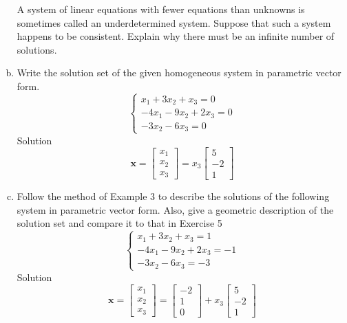 \begin{enumerate}[(a)]
    A system of linear equations with fewer equations than unknowns is sometimes called an underdetermined system. Suppose that such a system happens to be consistent. Explain why there must be an infinite number of solutions.
    \item
    Write the solution set of the given homogeneous system in parametric vector form.
    \begin{equation*}
        \begin{cases}
            x_{1}+3 x_{2}+x_{3}=0\\
            -4 x_{1}-9 x_{2}+2 x_{3}=0 \\
            -3 x_{2}-6 x_{3}=0
        \end{cases}
    \end{equation*}
    Solution
    $$\mathbf{x}=\left[\begin{array}{l}x_{1} \\ x_{2} \\ x_{3}\end{array}\right]=x_{3}\left[\begin{array}{r}5 \\ -2 \\ 1\end{array}\right]$$
    \item
    Follow the method of Example 3 to describe the solutions of the following system in parametric vector form. Also, give a geometric description of the solution set and compare it to that in Exercise 5
    \begin{equation*}
        \begin{cases}
            x_{1}+3 x_{2}+x_{3}=1 \\
            -4 x_{1}-9 x_{2}+2 x_{3}=-1 \\
            -3 x_{2}-6 x_{3} =-3
        \end{cases}
    \end{equation*}
    Solution
    $$
    \mathbf{x}=\left[\begin{array}{l}
    x_{1} \\
    x_{2} \\
    x_{3}
    \end{array}\right]=\left[\begin{array}{r}
    -2 \\
    1 \\
    0
    \end{array}\right]+x_{3}\left[\begin{array}{r}
    5 \\
    -2 \\
    1
    \end{array}\right]
    $$
\end{enumerate}